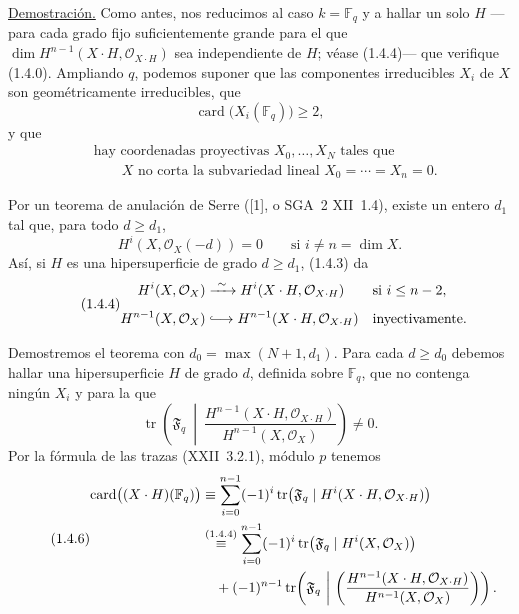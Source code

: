 \noindent\underline{Demostración.}
Como antes, nos reducimos al caso $k=\mathbb F_q$ y a hallar un solo $H$
---para cada grado fijo suficientemente grande para el que
$\dim H^{n-1}(X\mathbin{\cdot}H,\mathcal O_{X\cdot H})$ sea independiente
de $H$; véase (1.4.4)--- que verifique (1.4.0). Ampliando $q$, podemos
suponer que las componentes irreducibles $X_i$ de $X$ son
geométricamente irreducibles, que
\begin{equation}\tag{1.4.1}
\operatorname{card}\bigl(X_i(\mathbb F_q)\bigr)\geq2,
\end{equation}
y que
\begin{equation}\tag{1.4.2}
\begin{aligned}
&\text{hay coordenadas proyectivas }X_0,\dots,X_N\text{ tales que}\\
&\qquad X\text{ no corta la subvariedad lineal }
X_0=\cdots=X_n=0.
\end{aligned}
\end{equation}

\pageoriginale

Por un teorema de anulación de Serre ([1], o SGA~2 XII~1.4), existe un
entero $d_1$ tal que, para todo $d\geq d_1$,
\begin{equation}\tag{1.4.3}
H^i(X,\mathcal O_X(-d))=0\qquad\text{si }i\ne n=\dim X.
\end{equation}
Así, si $H$ es una hipersuperficie de grado $d\geq d_1$, (1.4.3) da
\begin{equation}\tag{1.4.4}
\begin{aligned}
H^i(X,\mathcal O_X)&\xrightarrow{\ \sim\ }
H^i(X\mathbin{\cdot}H,\mathcal O_{X\cdot H})
&&\text{si }i\leq n-2,\\[1ex]
H^{n-1}(X,\mathcal O_X)&\lhook\joinrel\longrightarrow
H^{n-1}(X\mathbin{\cdot}H,\mathcal O_{X\cdot H})
&&\text{inyectivamente}.
\end{aligned}
\end{equation}

Demostremos el teorema con $d_0=\max(N+1,d_1)$. Para cada $d\geq d_0$
debemos hallar una hipersuperficie $H$ de grado $d$, definida sobre
$\mathbb F_q$, que no contenga ningún $X_i$ y para la que
\begin{equation}\tag{1.4.5}
\operatorname{tr}\!\left(\mathfrak F_q\ \middle|\
\frac{H^{n-1}(X\cdot H,\mathcal O_{X\cdot H})}
{H^{n-1}(X,\mathcal O_X)}\right)\ne0.
\end{equation}
Por la fórmula de las trazas (XXII~3.2.1), módulo $p$ tenemos
\begin{equation}\tag{1.4.6}
\begin{aligned}
\operatorname{card}\bigl((X\cdot H)(\mathbb F_q)\bigr)
&\equiv\sum_{i=0}^{n-1}(-1)^i
\operatorname{tr}\bigl(\mathfrak F_q\mid
H^i(X\cdot H,\mathcal O_{X\cdot H})\bigr)\\
&\stackrel{(1.4.4)}{\equiv}
\sum_{i=0}^{n-1}(-1)^i
\operatorname{tr}\bigl(\mathfrak F_q\mid H^i(X,\mathcal O_X)\bigr)\\
&\quad+\sisi{(1)^{n-1}}{(-1)^{n-1}}\operatorname{tr}\!\left(
\mathfrak F_q\ \middle|\
\left(\frac{H^{n-1}(X\cdot H,\mathcal O_{X\cdot H})}
{H^{n-1}(X,\mathcal O_X)}\sisi{\right.\right.}{\right)\right)}.
\end{aligned}
\end{equation}

